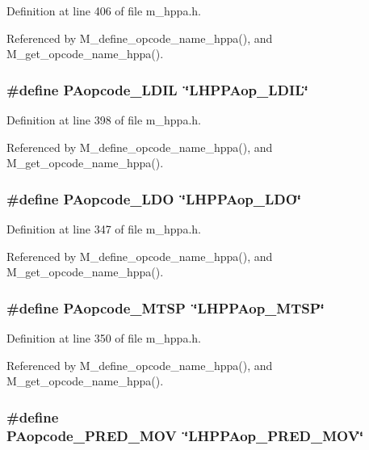 Definition at line 406 of file m\_\-hppa.h.

Referenced by M\_\-define\_\-opcode\_\-name\_\-hppa(), and M\_\-get\_\-opcode\_\-name\_\-hppa().
\subsubsection{\setlength{\rightskip}{0pt plus 5cm}\#define PAopcode\_\-LDIL~\char`\"{}LHPPAop\_\-LDIL\char`\"{}}\label{m__hppa_8h_1668fb709cebdf0131d5ab3c4f24411b}




Definition at line 398 of file m\_\-hppa.h.

Referenced by M\_\-define\_\-opcode\_\-name\_\-hppa(), and M\_\-get\_\-opcode\_\-name\_\-hppa().
\subsubsection{\setlength{\rightskip}{0pt plus 5cm}\#define PAopcode\_\-LDO~\char`\"{}LHPPAop\_\-LDO\char`\"{}}\label{m__hppa_8h_8ad8d983d1fcb20d8d4041d7c26f8eaa}




Definition at line 347 of file m\_\-hppa.h.

Referenced by M\_\-define\_\-opcode\_\-name\_\-hppa(), and M\_\-get\_\-opcode\_\-name\_\-hppa().
\subsubsection{\setlength{\rightskip}{0pt plus 5cm}\#define PAopcode\_\-MTSP~\char`\"{}LHPPAop\_\-MTSP\char`\"{}}\label{m__hppa_8h_8da07f9d5c615e0addf874ade20a679e}




Definition at line 350 of file m\_\-hppa.h.

Referenced by M\_\-define\_\-opcode\_\-name\_\-hppa(), and M\_\-get\_\-opcode\_\-name\_\-hppa().
\subsubsection{\setlength{\rightskip}{0pt plus 5cm}\#define PAopcode\_\-PRED\_\-MOV~\char`\"{}LHPPAop\_\-PRED\_\-MOV\char`\"{}}\label{m__hppa_8h_0d022c276b01d86ceb1c03f3a25e93ae}




